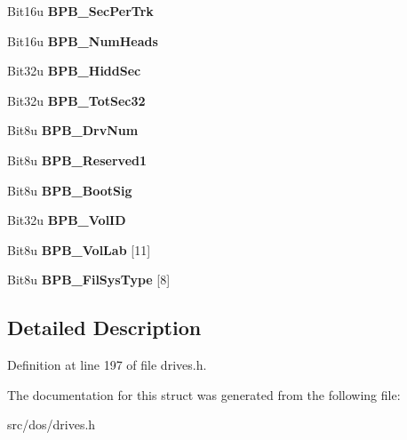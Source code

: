 \begin{DoxyCompactItemize}
\item 
\hypertarget{structFAT__BPB__MSDOS40_a304986e4e0cc6ddf9ea2bd1b8fea7ad5}{Bit16u {\bfseries B\-P\-B\-\_\-\-Sec\-Per\-Trk}}\label{structFAT__BPB__MSDOS40_a304986e4e0cc6ddf9ea2bd1b8fea7ad5}

\item 
\hypertarget{structFAT__BPB__MSDOS40_a370a2a238b4134e8ff1e1805a2760b84}{Bit16u {\bfseries B\-P\-B\-\_\-\-Num\-Heads}}\label{structFAT__BPB__MSDOS40_a370a2a238b4134e8ff1e1805a2760b84}

\item 
\hypertarget{structFAT__BPB__MSDOS40_a11d8656743a95c0f8dc5a8553a1ea89b}{Bit32u {\bfseries B\-P\-B\-\_\-\-Hidd\-Sec}}\label{structFAT__BPB__MSDOS40_a11d8656743a95c0f8dc5a8553a1ea89b}

\item 
\hypertarget{structFAT__BPB__MSDOS40_ae42a1721c601e07189777c57594d8f5c}{Bit32u {\bfseries B\-P\-B\-\_\-\-Tot\-Sec32}}\label{structFAT__BPB__MSDOS40_ae42a1721c601e07189777c57594d8f5c}

\item 
\hypertarget{structFAT__BPB__MSDOS40_a19748ef887d7d79985dc5dc28928991d}{Bit8u {\bfseries B\-P\-B\-\_\-\-Drv\-Num}}\label{structFAT__BPB__MSDOS40_a19748ef887d7d79985dc5dc28928991d}

\item 
\hypertarget{structFAT__BPB__MSDOS40_ad3ae2313de37bb68d1a01f0de7ba7857}{Bit8u {\bfseries B\-P\-B\-\_\-\-Reserved1}}\label{structFAT__BPB__MSDOS40_ad3ae2313de37bb68d1a01f0de7ba7857}

\item 
\hypertarget{structFAT__BPB__MSDOS40_a8efead1cd6c9a66b680cf60d241754dd}{Bit8u {\bfseries B\-P\-B\-\_\-\-Boot\-Sig}}\label{structFAT__BPB__MSDOS40_a8efead1cd6c9a66b680cf60d241754dd}

\item 
\hypertarget{structFAT__BPB__MSDOS40_aff214fd2dba90d65105d9d57a8c6fb3c}{Bit32u {\bfseries B\-P\-B\-\_\-\-Vol\-I\-D}}\label{structFAT__BPB__MSDOS40_aff214fd2dba90d65105d9d57a8c6fb3c}

\item 
\hypertarget{structFAT__BPB__MSDOS40_ad13bdc9173e264fc1c9486f9ee9db324}{Bit8u {\bfseries B\-P\-B\-\_\-\-Vol\-Lab} \mbox{[}11\mbox{]}}\label{structFAT__BPB__MSDOS40_ad13bdc9173e264fc1c9486f9ee9db324}

\item 
\hypertarget{structFAT__BPB__MSDOS40_affd09f38c17a3518fc73f3a1f2034152}{Bit8u {\bfseries B\-P\-B\-\_\-\-Fil\-Sys\-Type} \mbox{[}8\mbox{]}}\label{structFAT__BPB__MSDOS40_affd09f38c17a3518fc73f3a1f2034152}

\end{DoxyCompactItemize}


\subsection{Detailed Description}


Definition at line 197 of file drives.\-h.



The documentation for this struct was generated from the following file\-:\begin{DoxyCompactItemize}
\item 
src/dos/drives.\-h\end{DoxyCompactItemize}
